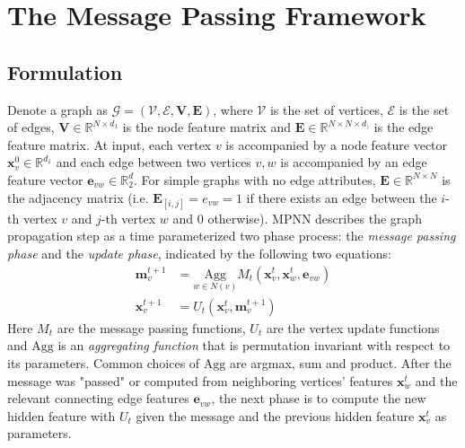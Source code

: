\section{The Message Passing Framework}
\subsection{Formulation}

Denote a graph as $\mathcal{G} = (\mathcal{V}, \mathcal{E}, \mathbf{V}, \mathbf{E})$,
where $\mathcal{V}$ is the set of vertices, $\mathcal{E}$ is the set of edges,
$\mathbf{V} \in \mathbb{R}^{N \times d_1}$ is the node feature matrix and
$\mathbf{E} \in \mathbb{R}^{N \times N \times d_)}$ is the edge feature matrix.
At input, each vertex $v$ is accompanied by a node feature vector
$\mathbf{x}_v^0 \in \mathbb{R}^{d_1}$ and each edge between two vertices $v,w$
is accompanied by an edge feature vector $\mathbf{e}_{vw} \in \mathbb{R}^d_2$.
For simple graphs with no edge attributes, $\mathbf{E} \in \mathbb{R}^{N \times
N}$ is the adjacency matrix (i.e. $\mathbf{E}_{[i,j]} = e_{vw}= 1$ if there exists
an edge between the $i$-th vertex $v$ and $j$-th vertex $w$ and $0$ otherwise).
MPNN describes the graph propagation step as a time parameterized two phase
process: the \textit{message passing phase} and the \textit{update phase},
indicated by the following two equations:
\begin{align}
  \mathbf{m}_{v}^{t+1} &= \underset{w \in N(v)}{\text{Agg}} M_t(\mathbf{x}_v^t,
\mathbf{x}_w^t, \mathbf{e}_{vw}) \\
  \mathbf{x}_v^{t+1} &= U_t(\mathbf{x}_v^t, \mathbf{m}_{v}^{t+1})
\end{align}
Here $M_t$ are the message passing functions, $U_t$ are the vertex update
functions and $\text{Agg}$ is an \textit{aggregating function} that is
permutation invariant with respect to its parameters. Common choices of
$\text{Agg}$ are argmax, sum and product. After the message was "passed" or
computed from neighboring vertices' features $\mathbf{x}_{w}^t$ and the relevant
connecting edge features $\mathbf{e}_{vw}$, the next phase is to compute the new
hidden feature with $U_t$ given the message and the previous hidden
feature $\mathbf{x}_{v}^{t}$ as parameters.


